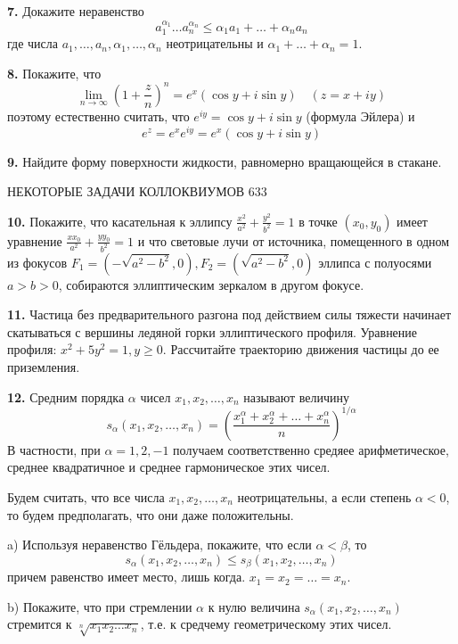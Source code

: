 \documentclass{article}
\newcommand\hr{\par\vspace{-.5\ht\strutbox}\noindent\hrulefill\par}
\begin{document}
\textbf{7.} Докажите неравенство
$$
a_1^{\alpha_1} \ldots a_n^{\alpha_n} \leqslant \alpha_1 a_1+\ldots+\alpha_n a_n
$$
где числа $a_1, \ldots, a_n, \alpha_1, \ldots, \alpha_n$ неотрицательны и $\alpha_1+\ldots+\alpha_n=1$.

\textbf{8.} Покажите, что
$$
\lim _{n \rightarrow \infty}\left(1+\frac{z}{n}\right)^n=e^x(\cos y+i \sin y) \quad(z=x+i y)
$$
поэтому естественно считать, что $e^{i y}=\cos y+i \sin y$ (формула Эйлера) и
$$
e^z=e^x e^{i y}=e^x(\cos y+i \sin y)
$$

\textbf{9.} Найдите форму поверхности жидкости, равномерно вращающейся в стакане.

\newpage
\thispagestyle{empty}

НЕКОТОРЫЕ ЗАДАЧИ КОЛЛОКВИУМОВ \mbox{}\hfill 633

\hr
\bigskip

\textbf{10.} Покажите, что касательная к эллипсу $\frac{x^2}{a^2}+\frac{y^2}{b^2}=1$ в точке $\left(x_0, y_0\right)$ имеет уравнение $\frac{x x_0}{a^2}+\frac{y y_0}{b^2}=1$ и что световые лучи от источника, помещенного в одном из фокусов $F_1=\left(-\sqrt{a^2-b^2}, 0\right), F_2=\left(\sqrt{a^2-b^2}, 0\right)$ эллипса с полуосями $a>b>0$, собираются эллиптическим зеркалом в другом фокусе.

\textbf{11.} Частица без предварительного разгона под действием силы тяжести начинает скатываться с вершины ледяной горки эллиптического профиля. Уравнение профиля: $x^2+5 y^2=1, y \geqslant 0$. Рассчитайте траекторию движения частицы до ее приземления.

\textbf{12.} Средним порядка $\alpha$ чисел $x_1, x_2, \ldots, x_n$ называют величину
$$
s_\alpha\left(x_1, x_2, \ldots, x_n\right)=\left(\frac{x_1^\alpha+x_2^\alpha+\ldots+x_n^\alpha}{n}\right)^{1 / \alpha}
$$
В частности, при $\alpha=1,2,-1$ получаем соответственно средяее арифметическое, среднее квадратичное и среднее гармоническое этих чисел.

Будем считать, что все числа $x_1, x_2, \ldots, x_n$ неотрицательны, а если степень $\alpha<0$, то будем предполагать, что они даже положительны.

a) Используя неравенство Гёльдера, покажите, что если $\alpha<\beta$, то
$$
s_\alpha\left(x_1, x_2, \ldots, x_n\right) \leqslant s_\beta\left(x_1, x_2, \ldots, x_n\right)
$$
причем равенство имеет место, лишь когда. $x_1=x_2=\ldots=x_n$.

b) Покажите, что при стремлении $\alpha$ к нулю величина $s_\alpha\left(x_1, x_2, \ldots, x_n\right)$ стремится к $\sqrt[n]{x_1 x_2 \ldots x_n}$, т.е. к средчему геометрическому этих чисел.
\end{document}
